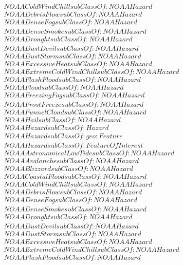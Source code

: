 \begin{align}
  NOAAColdWindChill subClassOf: NOAAHazard\\
  NOAADebrisFlow subClassOf: NOAAHazard\\
  NOAADenseFog subClassOf: NOAAHazard\\
  NOAADenseSmoke subClassOf: NOAAHazard\\
  NOAADrought subClassOf: NOAAHazard\\
  NOAADustDevil subClassOf: NOAAHazard\\
  NOAADustStorm subClassOf: NOAAHazard\\
  NOAAExcessiveHeat subClassOf: NOAAHazard\\
  NOAAExtremeColdWindChill subClassOf: NOAAHazard\\
  NOAAFlashFlood subClassOf: NOAAHazard\\
  NOAAFlood subClassOf: NOAAHazard\\
  NOAAFreezingFog subClassOf: NOAAHazard\\
  NOAAFrostFreeze subClassOf: NOAAHazard\\
  NOAAFunnelCloud subClassOf: NOAAHazard\\
  NOAAHail subClassOf: NOAAHazard\\
  NOAAHazard subClassOf: Hazard\\
  NOAAHazard subClassOf: geo:Feature\\
  NOAAHazard subClassOf: FeatureOfInterest\\
  NOAAAstronomicalLowTide subClassOf: NOAAHazard\\
  NOAAAvalanche subClassOf: NOAAHazard\\
  NOAABlizzard subClassOf: NOAAHazard\\
  NOAACoastalFlood subClassOf: NOAAHazard\\
  NOAAColdWindChill subClassOf: NOAAHazard\\
  NOAADebrisFlow subClassOf: NOAAHazard\\
  NOAADenseFog subClassOf: NOAAHazard\\
  NOAADenseSmoke subClassOf: NOAAHazard\\
  NOAADrought subClassOf: NOAAHazard\\
  NOAADustDevil subClassOf: NOAAHazard\\
  NOAADustStorm subClassOf: NOAAHazard\\
  NOAAExcessiveHeat subClassOf: NOAAHazard\\
  NOAAExtremeColdWindChill subClassOf: NOAAHazard\\
  NOAAFlashFlood subClassOf: NOAAHazard\\

\end{align}
